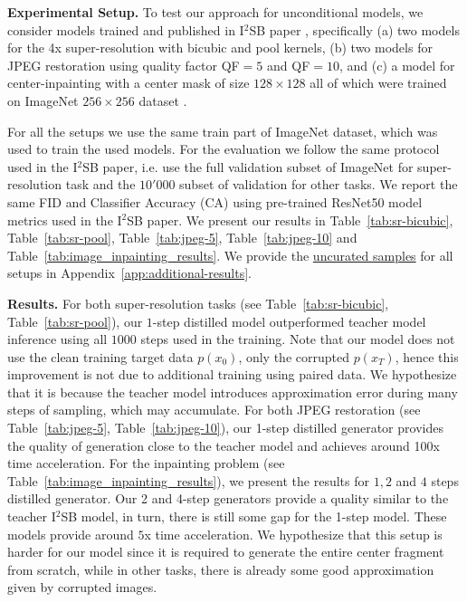 \textbf{Experimental Setup.} To test our approach for unconditional models, we consider models trained and published in I$^2$SB paper \citep{liu20232}, specifically (a) two models for the 4x super-resolution with bicubic and pool kernels, (b) two models for JPEG restoration using quality factor QF$=5$ and QF$=10$, and (c) a model for center-inpainting with a center mask of size $128 \times 128$ all of which were trained on ImageNet $256\times256$ dataset \citep{deng2009imagenet}. 

For all the setups we use the same train part of ImageNet dataset, which was used to train the used models. 
For the evaluation we follow the same protocol used in the I$^2$SB paper, i.e. use the full validation subset of ImageNet for super-resolution task and the $10'000$ subset of validation for other tasks. 
We report the same FID \cite{heusel2017gans} and Classifier Accuracy (CA) using pre-trained ResNet50 model metrics used in the I$^2$SB paper. We present our results in Table~\ref{tab:sr-bicubic}, Table~\ref{tab:sr-pool}, Table~\ref{tab:jpeg-5}, Table~\ref{tab:jpeg-10} and Table~\ref{tab:image_inpainting_results}. We provide the \underline{uncurated samples} for all setups in Appendix~\ref{app:additional-results}. 

\textbf{Results.} For both super-resolution tasks (see Table~\ref{tab:sr-bicubic}, Table~\ref{tab:sr-pool}), our $1$-step distilled model outperformed teacher model inference using all $1000$ steps used in the training. 
Note that our model does not use the clean training target data $p(x_0)$, only the corrupted $p(x_T)$, hence this improvement is not due to additional training using paired data. We hypothesize that it is because the teacher model introduces approximation error during many steps of sampling, which may accumulate. 
For both JPEG restoration (see Table~\ref{tab:jpeg-5}, Table~\ref{tab:jpeg-10}), our 1-step distilled generator provides the quality of generation close to the teacher model and achieves around 100x time acceleration. For the inpainting problem (see Table~\ref{tab:image_inpainting_results}), we present the results for $1,2$ and $4$ steps distilled generator. Our 2 and 4-step generators provide a quality similar to the teacher I$^2$SB model, in turn, there is still some gap for the 1-step model. These models provide around $5$x time acceleration. We hypothesize that this setup is harder for our model since it is required to generate the entire center fragment from scratch, while in other tasks, there is already some good approximation given by corrupted images.
\vspace{-2mm}
